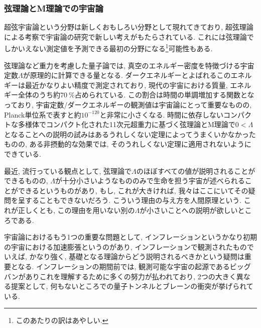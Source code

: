 \documentclass[10pt,a4paper]{jsarticle}
\begin{document}
\subsubsection*{弦理論とM理論での宇宙論}
超弦宇宙論という分野は新しくおもしろい分野として現れてきており, 超弦理論による考察で宇宙論の研究で新しい考えがもたらされている. これには弦理論でしかいえない測定値を予測できる最初の分野になる\footnote{このあたりの訳はあやしい. }可能性もある. \par
弦理論など重力を考慮した量子論では, 真空のエネルギー密度を特徴づける宇宙定数$\Lambda $が原理的に計算できる量となる. ダークエネルギーとよばれるこのエネルギーは最近かなりよい精度で測定されており, 現代の宇宙における質量, エネルギー全体のうち約$70\ \%$占められている. この割合は時間の単調増加する関数となっており, 宇宙定数/ダークエネルギーの観測値は宇宙論にとって重要なものの, Planck単位系で表すと約$10^{-120} $と非常に小さくなる. 時間に依存しないコンパクトな多様体でコンパクト化された11次元超重力に基づく弦理論とM理論で$0 < \Lambda $となることへの説明の試みはあるうれしくない定理によってうまくいかなかったものの, ある非摂動的な効果では, そのうれしくない定理に適用されないようにできている. \par
最近, 流行っている観点として, 弦理論で$\Lambda $のほぼすべての値が説明されることができるものの, $\Lambda $が十分小さいようなもののみで生命を担う宇宙が述べられることができるというものがあり, もし, これが大きければ, 我々はここにいてその疑問を呈することもできないだろう. こういう理由の与え方を人間原理という. これが正しくとも, この理由を用いない別の$\Lambda $が小さいことへの説明が欲しいところである. \par
宇宙論におけるもう1つの重要な問題として, インフレーションというかなり初期の宇宙における加速膨張というのがあり, インフレーションで観測されたものでいえば, かなり強く, 基礎となる理論からどう説明されるべきかという疑問は重要となる. インフレーションの期間前では, 観測可能な宇宙の起源であるビッグバンがありこれを理解するために多くの努力が払われており, 2つの大きく異なる提案として, 何もないところでの量子トンネルとブレーンの衝突が挙げられている. 
\end{document}
